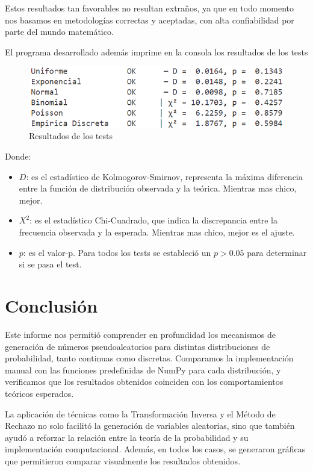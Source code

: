 \documentclass{article}
\begin{document}
Estos resultados tan favorables no resultan extraños, ya que en todo momento nos basamos en metodologías correctas y aceptadas, con alta confiabilidad por parte del mundo matemático.

El programa desarrollado además imprime en la consola los resultados de los tests

\begin{figure}[H]
    \centering
    \includegraphics[width=1\linewidth]{Imagenes/tests.png}
    \caption{Resultados de los tests}
    \label{fig:Distr.Poisson}
\end{figure}

Donde:
\begin{itemize}
    \item \( D \): es el estadístico de Kolmogorov-Smirnov, representa la máxima diferencia entre la función de distribución observada y la teórica. Mientras mas chico, mejor.
    \item \( X^2 \): es el estadístico Chi-Cuadrado, que indica la discrepancia entre la frecuencia observada y la esperada. Mientras mas chico, mejor es el ajuste.
    \item \( p \): es el valor-p. Para todos los tests se estableció un $p > 0.05$ para determinar si se pasa el test.
\end{itemize}


\section{Conclusión}
Este informe nos permitió comprender en profundidad los mecanismos de generación de números pseudoaleatorios para distintas distribuciones de probabilidad, tanto continuas como discretas. Comparamos la implementación manual con las funciones predefinidas de NumPy para cada distribución, y verificamos que los resultados obtenidos coinciden con los comportamientos teóricos esperados.

La aplicación de técnicas como la Transformación Inversa y el Método de Rechazo no solo facilitó la generación de variables aleatorias, sino que también ayudó a reforzar la relación entre la teoría de la probabilidad y su implementación computacional. Además, en todos los casos, se generaron gráficas que permitieron comparar visualmente los resultados obtenidos.
\end{document}
